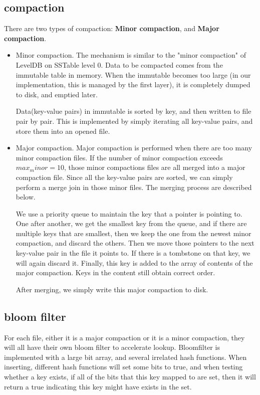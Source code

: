 \documentclass[a4paper]{article}
\begin{document}
\subsection{compaction}
There are two types of compaction: \textbf{Minor compaction}, and \textbf{Major compaction}.

\begin{itemize}
  \item Minor compaction. The mechanism is similar to the "minor compaction" of LevelDB on SSTable level 0. Data to be compacted comes from the immutable table in memory. When the immutable becomes too large (in our implementation, this is managed by the first layer), it is completely dumped to disk, and emptied later.

  Data(key-value pairs) in immutable is sorted by key, and then written to file pair by pair. This is implemented by simply iterating all key-value pairs, and store them into an opened file.

  \item Major compaction. Major compaction is performed when there are too many minor compaction files. If the number of minor compaction exceeds $max_minor = 10$, those minor compactions files are all merged into a major compaction file.  Since all the key-value pairs are sorted, we can simply perform a merge join in those minor files. The merging process are described below.

  We use a priority queue to maintain the key that a pointer is pointing to. One after another, we get the smallest key from the queue, and if there are multiple keys that are smallest, then we keep the one from the newest minor compaction, and discard the others. Then we move those pointers to the next key-value pair in the file it points to. If there is a tombstone on that key, we will again discard it. Finally, this key is added to the array of contents of the major compaction. Keys in the content still obtain correct order.

  After merging, we simply write this major compaction to disk.

\end{itemize}

\subsection{bloom filter}

For each file, either it is a major compaction or it is a minor compaction, they will all have their own bloom filter to accelerate lookup. Bloomfilter is implemented with a large bit array, and several irrelated hash functions. When inserting, different hash functions will set some bits to true, and when testing whether a key exists, if all of the bits that this key mapped to are set, then it will return a true indicating this key might have exists in the set.\\
\end{document}
